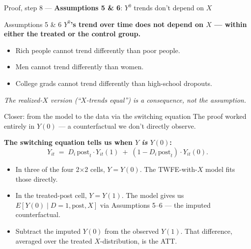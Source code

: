 \documentclass[aspectratio=169,11pt]{beamer}
\begin{document}
\begin{frame}{Proof, step 8 --- \textbf{Assumptions 5 \& 6}: $Y^0$ trends don't depend on $X$}
\vspace{0.4em}
\begin{block}{Assumptions 5 \& 6}
\centering
\small\textbf{$Y^0$'s trend over time does not depend on $X$ --- within either the treated or the control group.}
\end{block}
\vspace{0.4em}
\begin{itemize}\footnotesize
  \item Rich people cannot trend differently than poor people.
  \item Men cannot trend differently than women.
  \item College grads cannot trend differently than high-school dropouts.
\end{itemize}
\vspace{0.2em}
\begin{center}
\footnotesize\color{warmgray}\itshape
The realized-$X$ version (``$X$-trends equal'') is a \textit{consequence}, not the assumption.
\end{center}
\vspace{0.1em}
\begin{center}
\footnotesize
{}
\end{center}
\end{frame}

\begin{frame}{Closer: from the model to the data via the switching equation}
\footnotesize
The proof worked entirely in $Y(0)$ --- a counterfactual we don't directly observe.

\vspace{0.5em}
\textbf{The switching equation tells us when $Y$ \textit{is} $Y(0)$:}
\[
Y_{it} \;=\; D_i\,\text{post}_t \cdot Y_{it}(1) \;+\; (1 - D_i\,\text{post}_t) \cdot Y_{it}(0).
\]

\vspace{0.4em}
\begin{itemize}\setlength\itemsep{3pt}
  \item In three of the four 2$\times$2 cells, $Y = Y(0)$. \;The TWFE-with-$X$ model fits those directly.
  \item In the treated-post cell, $Y = Y(1)$. \;The model gives us $E[Y(0) \mid D{=}1, \text{post}, X]$ via Assumptions 5--6 --- the imputed counterfactual.
  \item Subtract the imputed $Y(0)$ from the observed $Y(1)$. \;That difference, averaged over the treated $X$-distribution, is the ATT.
\end{itemize}

\vspace{0.3em}
\end{frame}
\end{document}
